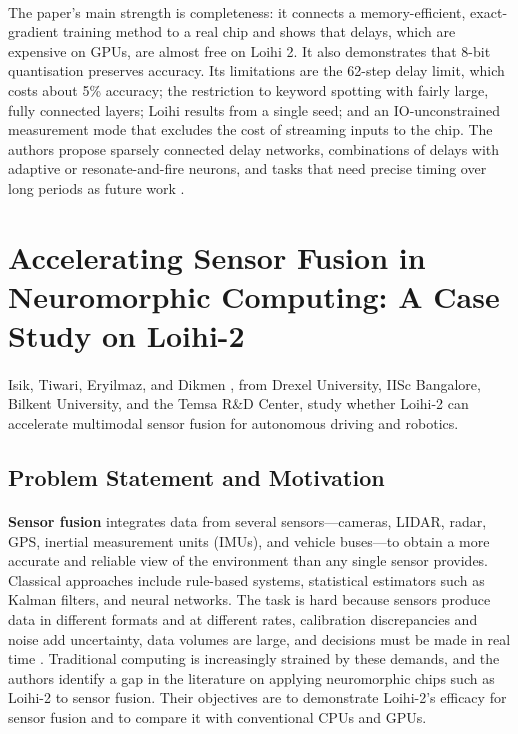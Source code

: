 \documentclass[12pt,a4paper,final]{extreport}
\begin{document}
\paragraph{} The paper's main strength is completeness: it connects a memory-efficient, exact-gradient training method to a real chip and shows that delays, which are expensive on GPUs, are almost free on Loihi 2. It also demonstrates that 8-bit quantisation preserves accuracy. Its limitations are the 62-step delay limit, which costs about 5\% accuracy; the restriction to keyword spotting with fairly large, fully connected layers; Loihi results from a single seed; and an IO-unconstrained measurement mode that excludes the cost of streaming inputs to the chip. The authors propose sparsely connected delay networks, combinations of delays with adaptive or resonate-and-fire neurons, and tasks that need precise timing over long periods as future work \cite{p1}.

\section{Accelerating Sensor Fusion in Neuromorphic Computing: A Case Study on Loihi-2}

\paragraph{} Isik, Tiwari, Eryilmaz, and Dikmen \cite{p2}, from Drexel University, IISc Bangalore, Bilkent University, and the Temsa R\&D Center, study whether Loihi-2 can accelerate multimodal sensor fusion for autonomous driving and robotics.

\subsection{Problem Statement and Motivation}

\paragraph{} \textbf{Sensor fusion} integrates data from several sensors---cameras, LIDAR, radar, GPS, inertial measurement units (IMUs), and vehicle buses---to obtain a more accurate and reliable view of the environment than any single sensor provides. Classical approaches include rule-based systems, statistical estimators such as Kalman filters, and neural networks. The task is hard because sensors produce data in different formats and at different rates, calibration discrepancies and noise add uncertainty, data volumes are large, and decisions must be made in real time \cite{p2}. Traditional computing is increasingly strained by these demands, and the authors identify a gap in the literature on applying neuromorphic chips such as Loihi-2 to sensor fusion. Their objectives are to demonstrate Loihi-2's efficacy for sensor fusion and to compare it with conventional CPUs and GPUs.
\end{document}
